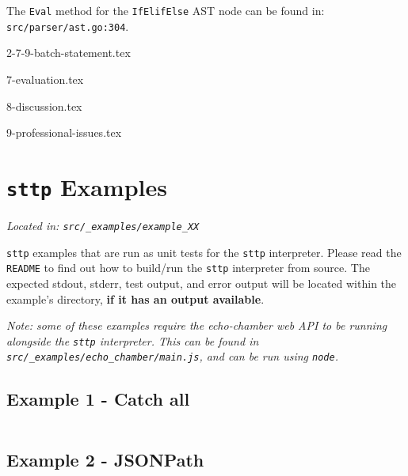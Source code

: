 \documentclass[]{full}
\theoremstyle{definition}
\begin{document}
The \verb|Eval| method for the \verb|IfElifElse| AST node can be found in: \verb|src/parser/ast.go:304|.






{2-7-9-batch-statement.tex}


{7-evaluation.tex}

{8-discussion.tex}

{9-professional-issues.tex}

\appendix

\cprotect\chapter{\verb|sttp| Examples}
\label{appendix:sttp-examples}

\cprotect\textit{Located in: \verb|src/_examples/example_XX|}

\verb|sttp| examples that are run as unit tests for the \verb|sttp| interpreter. Please read the \verb|README| to find out how to build/run the \verb|sttp| interpreter from source. The expected stdout, stderr, test output, and error output will be located within the example's directory, \textbf{if it has an output available}.

\cprotect\textit{Note: some of these examples require the echo-chamber web API to be running alongside the \verb|sttp| interpreter. This can be found in \verb|src/_examples/echo_chamber/main.js|, and can be run using \verb|node|.}

\section{Example 1 - Catch all}
\label{appendix:sttp-examples-1}
\inputminted[autogobble, breaklines, tabsize=4]{text}{../../src/_examples/example_01/example_01.sttp}

\section{Example 2 - JSONPath}
\label{appendix:sttp-examples-2}
\inputminted[autogobble, breaklines, tabsize=4]{text}{../../src/_examples/example_02/example_02.sttp}
\end{document}
